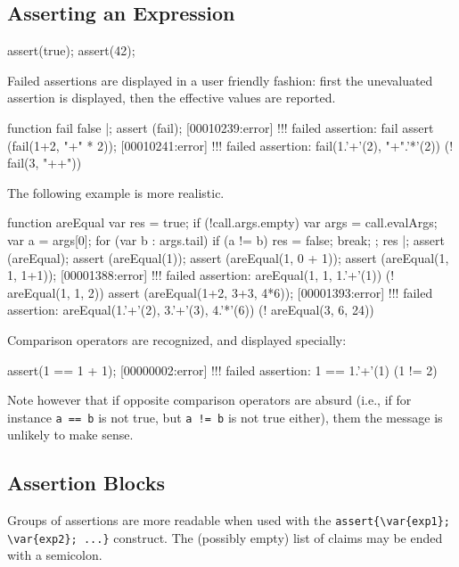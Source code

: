 \subsection{Asserting an Expression}

\begin{urbiscript}
assert(true);
assert(42);
\end{urbiscript}

Failed assertions are displayed in a user friendly fashion: first the
unevaluated assertion is displayed, then the effective values are reported.

\begin{urbiscript}
function fail { false }|;
assert (fail);
[00010239:error] !!! failed assertion: fail
assert (fail(1+2, "+" * 2));
[00010241:error] !!! failed assertion: fail(1.'+'(2), "+".'*'(2)) (! fail(3, "++"))
\end{urbiscript}

The following example is more realistic.

\begin{urbiscript}
function areEqual
{
  var res = true;
  if (!call.args.empty)
  {
    var args = call.evalArgs;
    var a = args[0];
    for (var b : args.tail)
      if (a != b)
      {
        res = false;
        break;
      }
  };
  res
}|;
assert (areEqual);
assert (areEqual(1));
assert (areEqual(1, 0 + 1));
assert (areEqual(1, 1, 1+1));
[00001388:error] !!! failed assertion: areEqual(1, 1, 1.'+'(1)) (! areEqual(1, 1, 2))
assert (areEqual(1+2, 3+3, 4*6));
[00001393:error] !!! failed assertion: areEqual(1.'+'(2), 3.'+'(3), 4.'*'(6)) (! areEqual(3, 6, 24))
\end{urbiscript}

Comparison operators are recognized, and displayed specially:
\begin{urbiscript}
assert(1 == 1 + 1);
[00000002:error] !!! failed assertion: 1 == 1.'+'(1) (1 != 2)
\end{urbiscript}

Note however that if opposite comparison operators are absurd (i.e., if for
instance \lstinline|a == b| is not true, but \lstinline|a != b| is not true
either), them the message is unlikely to make sense.

\subsection{Assertion Blocks}

Groups of assertions are more readable when used with the
\lstinline|assert{\var{exp1}; \var{exp2}; ...}| construct.  The
(possibly empty) list of claims may be ended with a semicolon.

